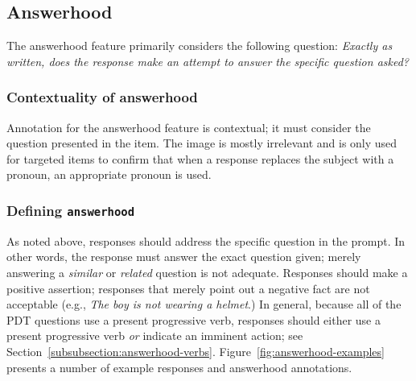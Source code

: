 \documentclass[12pt,notitlepage]{article}
\newcommand{\feat}[1]{\texttt{#1}}
\begin{document}
\subsection{Answerhood} \label{subsec:answerhood}

The answerhood feature primarily considers the following question: \textit{Exactly as written, does the response make an attempt to answer the specific question asked?}

\subsubsection{Contextuality of answerhood} Annotation for the answerhood feature is contextual; it must consider the question presented in the item. The image is mostly irrelevant and is only used for targeted items to confirm that when a response replaces the subject with a pronoun, an appropriate pronoun is used.

\subsubsection{Defining \feat{answerhood}} As noted above, responses should address the specific question in the prompt. In other words, the response must answer the exact question given; merely answering a \textit{similar} or \textit{related} question is not adequate. Responses should make a positive assertion; responses that merely point out a negative fact are not acceptable (e.g., \textit{The boy is not wearing a helmet}.) In general, because all of the PDT questions use a present progressive verb, responses should either use a present progressive verb \textit{or} indicate an imminent action; see Section~\ref{subsubsection:answerhood-verbs}. Figure~\ref{fig:answerhood-examples} presents a number of example responses and answerhood annotations. 
\end{document}
